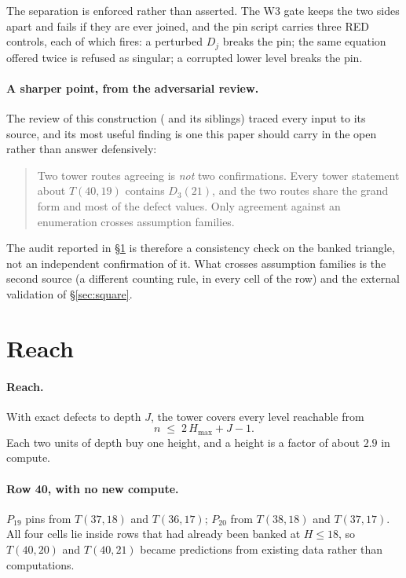\documentclass[11pt]{article}
\newcommand{\Dj}{D_j}
\begin{document}
The separation is enforced rather than asserted. The W3 gate keeps the two
sides apart and fails if they are ever joined, and the pin script
carries three RED controls, each of which fires: a perturbed $\Dj$ breaks the
pin; the same equation offered twice is refused as singular; a corrupted lower
level breaks the pin.

\paragraph{A sharper point, from the adversarial review.} The review of this
construction ( and its siblings) traced every
input to its source, and its most useful finding is one this paper should carry
in the open rather than answer defensively:

\begin{quote}
Two tower routes agreeing is \emph{not} two confirmations. Every tower statement
about $T(40,19)$ contains $D_3(21)$, and the two routes share the grand form and
most of the defect values. Only agreement against an enumeration crosses
assumption families.
\end{quote}

The audit reported in \S\ref{sec:bought} is therefore a consistency check on the
banked triangle, not an independent confirmation of it. What crosses assumption
families is the second source (a different counting rule, in every cell of the
row) and the external validation of \S\ref{sec:square}.

\section{Reach}\label{sec:bought}

\paragraph{Reach.} With exact defects to depth $J$, the tower covers every level
reachable from
\[
  n \;\le\; 2\,H_{\max} + J - 1 .
\]
Each two units of depth buy one height, and a height is a factor of about $2.9$
in compute.

\paragraph{Row 40, with no new compute.} $P_{19}$ pins from $T(37,18)$ and
$T(36,17)$; $P_{20}$ from $T(38,18)$ and $T(37,17)$. All four cells lie inside
rows that had already been banked at $H \le 18$, so $T(40,20)$ and $T(40,21)$
became predictions from existing data rather than computations.
\end{document}
